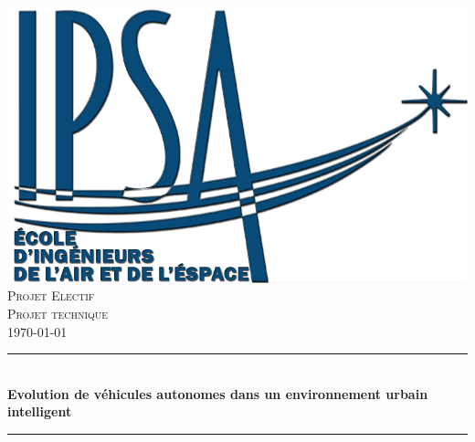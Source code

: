\begin{titlepage}

\newcommand{\HRule}{\rule{\linewidth}{0.5mm}} %

\center %
 

\includegraphics[scale=0.6]{Graphics/logo.png}\\[1.5cm]

\textsc{\Large Projet Electif}\\[0.5cm] %
\textsc{\large Projet technique}\\[0.5cm] %

{\normalsize \today}\\[1.5cm]


\HRule \\[0.4cm]
{ \Large \bfseries Evolution de véhicules autonomes dans un environnement urbain intelligent}\\[0.4cm] %
\HRule \\[2.5cm]




\end{titlepage}
